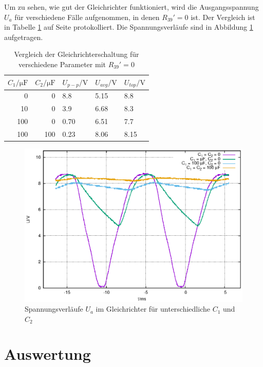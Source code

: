 \documentclass[10pt,a4paper]{scrartcl}
\begin{document}
Um zu sehen, wie gut der Gleichrichter funktioniert,
wird die Ausgangsspannung $U_a$ für verschiedene Fälle aufgenommen,
in denen $R_{39}'=0$ ist.
Der Vergleich ist in Tabelle \ref{tb:Gleichrichter} auf Seite
\pageref{tb:Gleichrichter} protokolliert.
Die Spannungsverläufe sind in Abbildung \ref{fig:Gleichrichter_U2} aufgetragen.

\begin{table}[!ht]
    \centering
    \caption{Vergleich der Gleichrichterschaltung für verschiedene Parameter
    mit $R_{39}'=0$}
    \label{tb:Gleichrichter}
    \begin{tabular}{r|r|l|l|l}
        $C_1/\mathrm{\mu F}$&$C_2/\mathrm{\mu F}$&$U_{p-p}/\mathrm V$
        &$U_{avg}/\mathrm V$&$U_{top}/\mathrm V$\\
        \hline
        0&0&8.8&5.15&8.8\\
        10&0&3.9&6.68&8.3\\
        100&0&0.70&6.51&7.7\\
        100&100&0.23&8.06&8.15\\
    \end{tabular}
\end{table}

\begin{figure}
    \centering
    \includegraphics[width=\textwidth]{graphics/gleichrichter_spannungen.eps}
    \caption{Spannungsverläufe $U_a$ im Gleichrichter für unterschiedliche
    $C_1$ und $C_2$}
    \label{fig:Gleichrichter_U2}
\end{figure}


\section {Auswertung}
\end{document}
